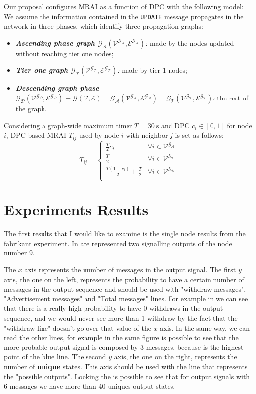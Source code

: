 \documentclass[10pt,conference,letterpaper]{IEEEtran}
\newcommand{\update}{\texttt{UPDATE}\xspace}
\newcommand{\nodeset}{\ensuremath{\mathcal{V}}\xspace}
\newcommand{\edgeset}{\ensuremath{\mathcal{E}}\xspace}
\newcommand{\graph}{\ensuremath{\mathcal{G(\nodeset,\edgeset)}}\xspace}
\newcommand{\ascentg}{\ensuremath{\mathcal{G_{A}}\xspace}}
\newcommand{\ascentnodeset}{\ensuremath{\mathcal{V^{\ascentg}}}\xspace}
\newcommand{\ascentedgeset}{\ensuremath{\mathcal{E^{\ascentg}}}\xspace}
\newcommand{\ascentgraph}{\ensuremath{\mathcal{\ascentg(\ascentnodeset,\ascentedgeset)}}\xspace}
\newcommand{\tierg}{\ensuremath{\mathcal{G_{T}}\xspace}}
\newcommand{\tiernodeset}{\ensuremath{\mathcal{V^{\tierg}}}\xspace}
\newcommand{\tieredgeset}{\ensuremath{\mathcal{E^{\tierg}}}\xspace}
\newcommand{\tiergraph}{\ensuremath{\mathcal{\tierg(\tiernodeset,\tieredgeset)}}\xspace}
\newcommand{\descentg}{\ensuremath{\mathcal{G_{D}}\xspace}}
\newcommand{\descentnodeset}{\ensuremath{\mathcal{V^{\descentg}}}\xspace}
\newcommand{\descentedgeset}{\ensuremath{\mathcal{E^{\descentg}}}\xspace}
\newcommand{\descentgraph}{\ensuremath{\mathcal{\descentg(\descentnodeset,\descentedgeset)}}\xspace}
\begin{document}
Our proposal configures \ac{MRAI} as a function of \ac{DPC} with the following 
model: We assume the information contained in the \update message propagates in 
the network in three phases, which identify three propagation graphs:
\begin{itemize}
    \item \textit{\textbf{Ascending phase graph \ascentgraph}:} made by the 
		nodes updated without reaching tier one nodes;
    \item \textit{\textbf{Tier one graph \tiergraph}:} made by tier-1 nodes;
    \item \textit{\textbf{Descending graph phase $\descentgraph = \graph - \ascentgraph - \tiergraph$}:} 
		the rest of the graph.
\end{itemize}

Considering a graph-wide maximum timer $T=\SI{30}{\second}$ and \ac{DPC} 
$c_i\in [0,1]$ for node $i$, DPC-based \ac{MRAI} $T_{ij}$ used by node $i$ 
with neighbor $j$ is set as follows:
\begin{equation}
    T_{ij}=
    \begin{cases}
    \frac{T}{2}c_i & \forall i\in \ascentnodeset  \\
    \frac{T}{2} & \forall i\in \tiernodeset \\
    \frac{T(1-c_i)}{2}+\frac{T}{2} & \forall i\in \descentnodeset\\
    \end{cases}
\end{equation} 

\section{Experiments Results}
\label{sec:results}

The first results that I would like to examine is the single node
results from the fabrikant experiment.
In  are represented
two signalling outputs of the node number \num{9}.

The $x$ axis represents the number of messages in the output signal.
The first $y$ axis, the one on the left, represents the probability to have a certain
number of messages in the output sequence and should be used with "withdraw
messages", "Advertisement messages" and "Total messages" lines.
For example in  we can see that there is a really
high probability to have \num{0} withdraws in the output sequence, and we would never
see more than 1 withdraw by the fact that the "withdraw line" doesn't go over that
value of the $x$ axis.
In the same way, we can read the other lines, for example in the same figure is
possible to see that the more probable output signal is composed by \num{3} messages,
because is the highest point of the blue line.
The second $y$ axis, the one on the right, represents the number of \textbf{unique}
states.
This axis should be used with the line that represents the "possible outputs".
Looking the  is possible to see that for
output signals with \num{6} messages we have more than \num{40} uniques output
states.
\end{document}
